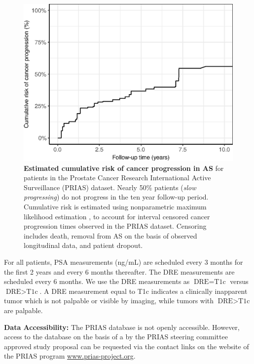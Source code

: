 \begin{figure}[!htb]
\captionsetup{justification=justified}
\centerline{\includegraphics[width=\columnwidth]{images/npmle_plot.eps}}
\caption{\textbf{Estimated cumulative risk of cancer progression in AS} for patients in the Prostate Cancer Research International Active Surveillance (PRIAS) dataset. Nearly 50\% patients (\textit{slow progressing}) do not progress in the ten year follow-up period. Cumulative risk is estimated using nonparametric maximum likelihood estimation \citep{turnbull1976empirical}, to account for interval censored cancer progression times observed in the PRIAS dataset. Censoring includes death, removal from AS on the basis of observed longitudinal data, and patient dropout.}
\label{fig:npmle_plot}
\end{figure}

For all patients, PSA measurements (ng/mL) are scheduled every 3 months for the first 2 years and every 6 months thereafter. The DRE measurements are scheduled every 6 months. We use the DRE measurements as $\mbox{DRE} = \mbox{T1c}$ versus $\mbox{DRE} > \mbox{T1c}$. A DRE measurement equal to T1c\cite{schroder1992tnm} indicates a clinically inapparent tumor which is not palpable or visible by imaging, while tumors with $\mbox{DRE} > \mbox{T1c}$ are palpable.

\textbf{Data Accessibility:} The PRIAS database is not openly accessible. However, access to the database on the basis of a by the PRIAS steering committee approved study proposal can be requested via the contact links on the website of the PRIAS program \url{www.prias-project.org}.


